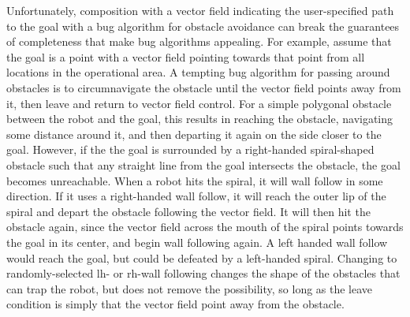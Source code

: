 Unfortunately, composition with a vector field indicating the user-specified path to the goal with a bug algorithm for obstacle avoidance can break the guarantees of completeness that make bug algorithms appealing. 
For example, assume that the goal is a point with a vector field pointing towards that point from all locations in the operational area. 
A tempting bug algorithm for passing around obstacles is to circumnavigate the obstacle until the vector field points away from it, then leave and return to vector field control. 
For a simple polygonal obstacle between the robot and the goal, this results in reaching the obstacle, navigating some distance around it, and then departing it again on the side closer to the goal. 
However, if the the goal is surrounded by a right-handed spiral-shaped obstacle such that any straight line from the goal intersects the obstacle, the goal becomes unreachable. 
When a robot hits the spiral, it will wall follow in some direction.
If it uses a right-handed wall follow, it will reach the outer lip of the spiral and depart the obstacle following the vector field. It will then hit the obstacle again, since the vector field across the mouth of the spiral points towards the goal in its center, and begin wall following again. 
A left handed wall follow would reach the goal, but could be defeated by a left-handed spiral. 
Changing to randomly-selected lh- or rh-wall following changes the shape of the obstacles that can trap the robot, but does not remove the possibility, so long as the leave condition is simply that the vector field point away from the obstacle. 

